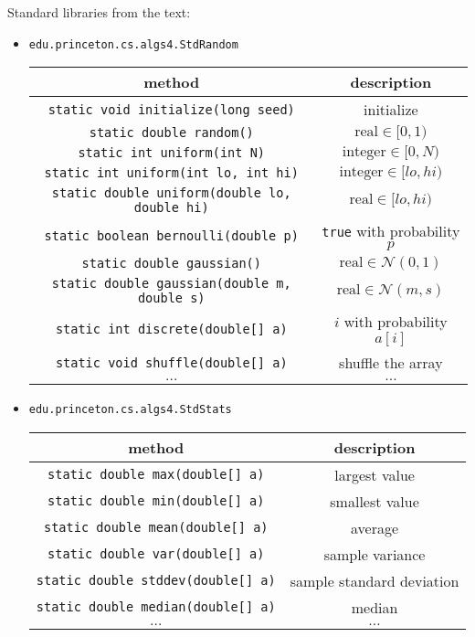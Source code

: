 \documentclass[8pt,a4paper,compress]{beamer}
\begin{document}
\begin{frame}[fragile]
Standard libraries from the text:
\begin{itemize}
\item \lstinline{edu.princeton.cs.algs4.StdRandom}
\begin{center}
\begin{tabular}{cc}
method & description \\ \hline
\lstinline$static void initialize(long seed)$ & initialize \\
\lstinline$static double random()$ & $\text{real} \in [0, 1)$ \\
\lstinline$static int uniform(int N)$ & $\text{integer} \in [0, N)$ \\
\lstinline$static int uniform(int lo, int hi)$ & $\text{integer} \in [lo, hi)$ \\
\lstinline$static double uniform(double lo, double hi)$ & $\text{real} \in [lo, hi)$ \\
\lstinline$static boolean bernoulli(double p)$ & \lstinline$true$ with probability $p$ \\
\lstinline$static double gaussian()$ & $\text{real} \in \mathcal{N}(0, 1)$ \\
\lstinline$static double gaussian(double m, double s)$ & $\text{real} \in \mathcal{N}(m, s)$ \\
\lstinline$static int discrete(double[] a)$ & $i$ with probability $a[i]$ \\
\lstinline$static void shuffle(double[] a)$ & shuffle the array \\
$\dots$ & $\dots$ 
\end{tabular} 
\end{center}

\item \lstinline{edu.princeton.cs.algs4.StdStats}
\begin{center}
\begin{tabular}{cc}
method & description \\ \hline
\lstinline$static double max(double[] a)$ & largest value \\
\lstinline$static double min(double[] a)$ & smallest value \\
\lstinline$static double mean(double[] a)$ & average \\
\lstinline$static double var(double[] a)$ & sample variance \\
\lstinline$static double stddev(double[] a)$ & sample standard deviation \\
\lstinline$static double median(double[] a)$ & median \\
$\dots$ & $\dots$ 
\end{tabular} 
\end{center}
\end{itemize}
\end{frame}
\end{document}
